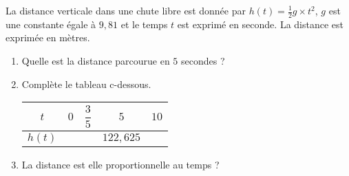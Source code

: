 
La distance verticale dans une chute libre est donnée par $h(t)=\frac{1}{2}g\times t^2$, $g$ est une constante égale à $9,81$ et le temps $t$ est exprimé en seconde. La distance est exprimée en mètres.

\begin{enumerate}
\item Quelle est la distance parcourue en $5$ secondes ? 
\item Complète le tableau c-dessous.

 \begin{tabular}{|c|c|c|c|c|}
 \hline 
 $t$ & $0$ & $\dfrac{3}{5}$ &  $5$ & $10$    \\ 
 \hline 
 $h(t)$ &  &  & $122,625$ &  \\ 
 \hline 
 \end{tabular} 
\item La distance est elle proportionnelle au temps ?
\end{enumerate}
